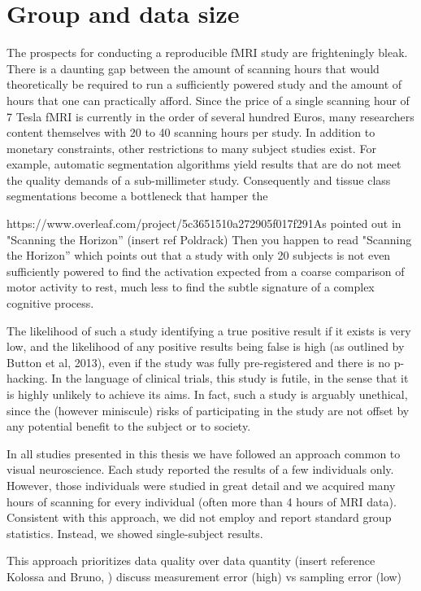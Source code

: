 \section{Group and data size}
The prospects for conducting a reproducible fMRI study are frighteningly bleak. There is a daunting gap between the amount of scanning hours that would theoretically be required to run a sufficiently powered study and the amount of hours that one can practically afford. Since the price of a single scanning hour of 7 Tesla fMRI is currently in the order of several hundred Euros, many researchers content themselves with 20 to 40 scanning hours per study. In addition to monetary constraints, other restrictions to many subject studies exist. For example, automatic segmentation algorithms yield results that are do not meet the quality demands of a sub-millimeter study. Consequently and tissue class segmentations become a bottleneck that hamper the 

https://www.overleaf.com/project/5c3651510a272905f017f291As pointed out in "Scanning the Horizon” (insert ref Poldrack)
Then you happen to read "Scanning the Horizon” which points out that a study with only 20 subjects is not even sufficiently powered to find the activation expected from a coarse comparison of motor activity to rest, much less to find the subtle signature of a complex cognitive process.

The likelihood of such a study identifying a true positive result if it exists is very low, and the likelihood of any positive results being false is high (as outlined by Button et al, 2013), even if the study was fully pre-registered and there is no p-hacking.  In the language of clinical trials, this study is futile, in the sense that it is highly unlikely to achieve its aims. In fact, such a study is arguably unethical, since the (however miniscule) risks of participating in the study are not offset by any potential benefit to the subject or to society. 

In all studies presented in this thesis we have followed an approach common to visual neuroscience. Each study reported the results of a few individuals only. However, those individuals were studied in great detail and we acquired many hours of scanning for every individual (often more than 4 hours of MRI data). Consistent with this approach, we did not employ and report standard group statistics. Instead, we showed single-subject results.

This approach prioritizes data quality over data quantity (insert reference Kolossa and Bruno, )
discuss measurement error (high) vs sampling error (low)

